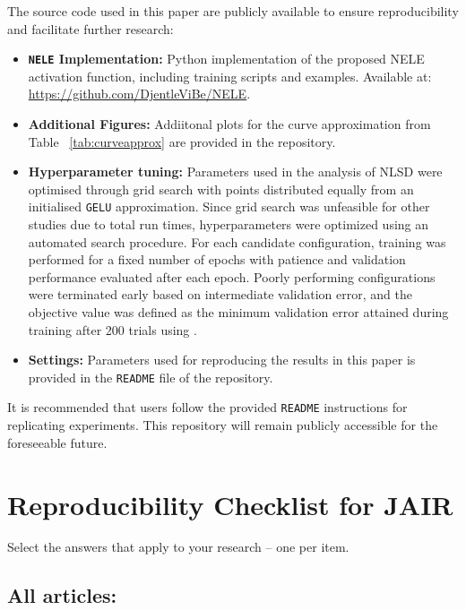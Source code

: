 \documentclass[manuscript, screen, review]{jair}
\begin{document}
The source code used in this paper are publicly available to ensure reproducibility and facilitate further research:

\begin{itemize}
    \item \textbf{\texttt{NELE} Implementation:} Python implementation of the proposed NELE activation function, including training scripts and examples. Available at: 
    \url{https://github.com/DjentleViBe/NELE}.
    
    \item \textbf{Additional Figures:} Addiitonal plots for the curve approximation from Table ~\ref{tab:curveapprox} are provided in the repository.
    \item \textbf{Hyperparameter tuning: }Parameters used in the analysis of NLSD were optimised through grid search with points 
    distributed equally from an initialised \texttt{GELU} approximation. Since grid search was unfeasible for other studies due to total run times, 
    hyperparameters were optimized using an automated search procedure. 
    For each candidate configuration, training was performed for a fixed number of 
    epochs with patience and validation performance evaluated after each epoch. Poorly performing 
    configurations were terminated early based on intermediate validation error, 
    and the objective value was defined as the minimum validation error attained during training after 200 trials using \cite{optuna_2019}.
    \item \textbf{Settings:} Parameters used for reproducing the results in this paper is provided in the
    \texttt{README} file of the repository.
  
\end{itemize}

It is recommended that users follow the provided \texttt{README} instructions for replicating experiments. This repository will remain publicly accessible for the foreseeable future.

\section{Reproducibility Checklist for JAIR}

Select the answers that apply to your research -- one per item. 

\subsection*{All articles:}
\end{document}
